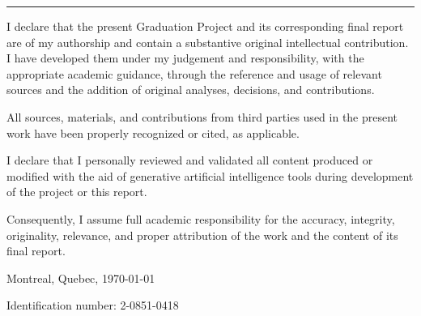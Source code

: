 \thispagestyle{empty}

\rule{10mm}{0pt}

\vfill

I declare that the present Graduation Project and its corresponding final report are of my authorship and contain a substantive original intellectual contribution.
I have developed them under my judgement and responsibility, with the appropriate academic guidance, through the reference and usage of relevant sources and the addition of original analyses, decisions, and contributions.

All sources, materials, and contributions from third parties used in the present work have been properly recognized or cited, as applicable.

I declare that I personally reviewed and validated all content produced or modified with the aid of generative artificial intelligence tools during development of the project or this report.

Consequently, I assume full academic responsibility for the accuracy, integrity, originality, relevance, and proper attribution of the work and the content of its final report.

\vspace*{8mm}

\begin{flushright}
  \scriptAuthor\par
  Montreal, Quebec, \today\par
  Identification number: 2-0851-0418
\end{flushright}

\cleardoublepage

